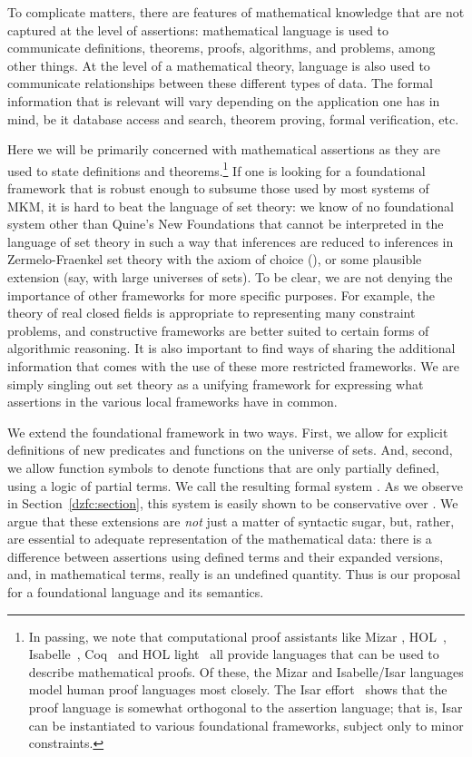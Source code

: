 \documentclass{llncs}
\begin{document}
To complicate matters, there are features of mathematical knowledge
that are not captured at the level of assertions: mathematical
language is used to communicate definitions, theorems, proofs,
algorithms, and problems, among other things. At the level of a
mathematical theory, language is also used to communicate
relationships between these different types of data. The formal
information that is relevant will vary depending on the application
one has in mind, be it database access and search, theorem proving,
formal verification, etc.

Here we will be primarily concerned with mathematical assertions as
they are used to state definitions and theorems.\footnote{In passing,
  we note that computational proof assistants like Mizar
  \cite{rudniki:92}, HOL~\cite{gordon:melham:93},
  Isabelle~\cite{nipkow:et:al:02}, Coq~\cite{bertot:casteran:04} and
  HOL light~\cite{harrison:96} all provide languages that can be used
  to describe mathematical proofs. Of these, the Mizar and
  Isabelle/Isar languages model human proof languages most closely.
  The Isar effort~\cite{wenzel:07} shows that the proof language is
  somewhat orthogonal to the assertion language; that is, Isar can be
  instantiated to various foundational frameworks, subject only to
  minor constraints.} If one is looking for a foundational
framework that is robust enough to subsume those used by most systems
of MKM, it is hard to beat the language of set theory: we know of no
foundational system other than Quine's New Foundations that cannot be
interpreted in the language of set theory in such a way that
inferences are reduced to inferences in Zermelo-Fraenkel set theory
with the axiom of choice (), or some plausible extension
(say, with large universes of sets). To be clear, we are not denying
the importance of other frameworks for more specific purposes.  For
example, the theory of real closed fields is appropriate to
representing many constraint problems, and constructive frameworks are
better suited to certain forms of algorithmic reasoning. It is also
important to find ways of sharing the additional information that
comes with the use of these more restricted frameworks. We are simply
singling out set theory as a unifying framework for expressing what
assertions in the various local frameworks have in common.

We extend the foundational framework in two ways. First, we allow for
explicit definitions of new predicates and functions on the universe
of sets. And, second, we allow function symbols to denote functions
that are only partially defined, using a logic of partial terms. We
call the resulting formal system . As we observe in
Section~\ref{dzfc:section}, this system is easily shown to be
conservative over .  We argue that these extensions are
\emph{not} just a matter of syntactic sugar, but, rather, are
essential to adequate representation of the mathematical data: there
is a difference between assertions using defined terms and their
expanded versions, and, in mathematical terms,  really is an
undefined quantity. Thus  is our proposal for a
foundational language and its semantics.
\end{document}
